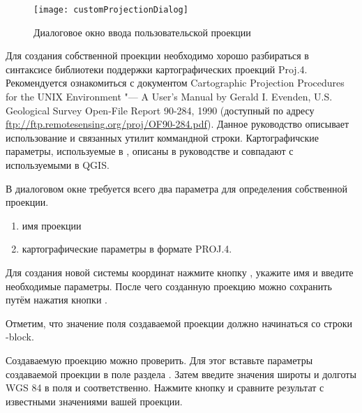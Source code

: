 \begin{figure}[ht]
   \centering
   \texttt{[image: customProjectionDialog]}
   \caption{Диалоговое окно ввода пользовательской проекции
   \wincaption}\label{fig:customprojections}
\end{figure}

Для создания собственной проекции необходимо хорошо разбираться в синтаксисе
библиотеки поддержки картографических проекций Proj.4. Рекомендуется
ознакомиться с документом Cartographic Projection Procedures for
the UNIX Environment "--- A User's Manual by Gerald I. Evenden, U.S.
Geological Survey Open-File Report 90-284, 1990
(доступный по адресу \url{ftp://ftp.remotesensing.org/proj/OF90-284.pdf}).
Данное руководство описывает использование  и связанных
утилит коммандной строки. Картографичские параметры, используемые в
, описаны в руководстве и совпадают с используемыми в QGIS.

В диалоговом окне 
требуется всего два параметра для определения собственной проекции.
\begin{enumerate}
\item имя проекции
\item картографические параметры в формате PROJ.4.
\end{enumerate}
Для создания новой системы координат нажмите кнопку
, укажите имя и введите необходимые параметры. После
чего созданную проекцию можно сохранить путём нажатия кнопки
.

Отметим, что значение поля  создаваемой проекции должно
начинаться со строки -block.

Создаваемую проекцию можно проверить.
Для этог вставьте параметры создаваемой проекции в поле
 раздела . Затем введите значения
широты и долготы WGS 84 в поля  и 
соответственно. Нажмите кнопку  и сравните результат
с известными значениями вашей проекции.

\FloatBarrier
